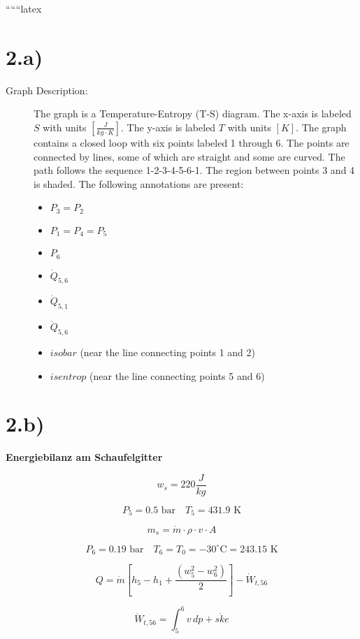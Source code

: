 
``````latex


\section*{2.a)}

\begin{description}
    \item[Graph Description:] The graph is a Temperature-Entropy (T-S) diagram. The x-axis is labeled \( S \) with units \([ \frac{J}{kg \cdot K} ]\). The y-axis is labeled \( T \) with units \([ K ]\). The graph contains a closed loop with six points labeled 1 through 6. The points are connected by lines, some of which are straight and some are curved. The path follows the sequence 1-2-3-4-5-6-1. The region between points 3 and 4 is shaded. The following annotations are present:
    \begin{itemize}
        \item \( P_3 = P_2 \)
        \item \( P_1 = P_4 = P_5 \)
        \item \( P_6 \)
        \item \( \dot{Q}_{5,6} \)
        \item \( \dot{Q}_{5,1} \)
        \item \( \dot{Q}_{5,6} \)
        \item \( isobar \) (near the line connecting points 1 and 2)
        \item \( isentrop \) (near the line connecting points 5 and 6)
    \end{itemize}
\end{description}

\section*{2.b)}

\textbf{Energiebilanz am Schaufelgitter}

\[
w_s = 220 \frac{J}{kg}
\]

\[
P_5 = 0.5 \text{ bar} \quad T_5 = 431.9 \text{ K}
\]

\[
m_s = \dot{m} \cdot \rho \cdot v \cdot A
\]

\[
P_6 = 0.19 \text{ bar} \quad T_6 = T_0 = -30^\circ \text{C} = 243.15 \text{ K}
\]

\[
Q = \dot{m} \left[ h_5 - h_1 + \frac{(w_5^2 - w_6^2)}{2} \right] - \dot{W}_{t,56}
\]

\[
\dot{W}_{t,56} = \int_{5}^{6} v \, dp + \dot{ske}
\]

